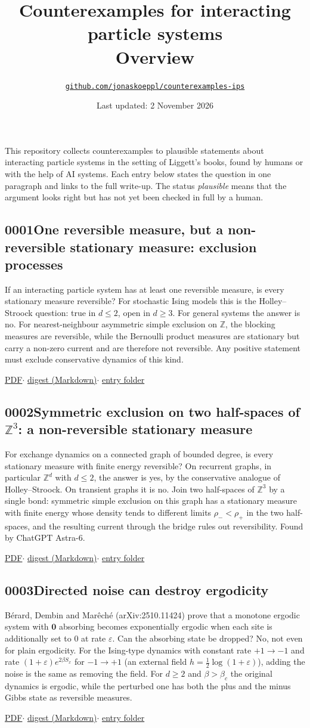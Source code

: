\documentclass[11pt]{article}
\title{Counterexamples for interacting particle systems\\[2pt]\large Overview}
\author{\href{\repo}{\texttt{github.com/jonaskoeppl/counterexamples-ips}}}
\date{Last updated: 2 November 2026\vspace{-1ex}}
\newcommand{\Z}{\mathbb{Z}}
\newcommand{\repo}{https://github.com/jonaskoeppl/counterexamples-ips}
\newcommand{\entrylinks}[1]{\par\smallskip\noindent\small
  \href{\repo/blob/main/pdf/#1.pdf}{PDF}\enspace$\cdot$\enspace
  \href{\repo/blob/main/entries/#1/digest.md}{digest (Markdown)}\enspace$\cdot$\enspace
  \href{\repo/tree/main/entries/#1}{entry folder}\normalsize}
\newcommand{\entry}[3]{\subsection*{#1\quad #2}\noindent{\small Status: \emph{#3}}\par\smallskip\noindent\ignorespaces}
\begin{document}
\maketitle

This repository collects counterexamples to plausible statements about interacting particle systems in the setting of Liggett's books, found by humans or with the help of AI systems. Each entry below states the question in one paragraph and links to the full write-up. The status \emph{plausible} means that the argument looks right but has not yet been checked in full by a human.

\entry{0001}{One reversible measure, but a non-reversible stationary measure: exclusion processes}{plausible}
If an interacting particle system has at least one reversible measure, is every stationary measure reversible? For stochastic Ising models this is the Holley--Stroock question: true in $d\le2$, open in $d\ge3$. For general systems the answer is no. For nearest-neighbour asymmetric simple exclusion on $\Z$, the blocking measures are reversible, while the Bernoulli product measures are stationary but carry a non-zero current and are therefore not reversible. Any positive statement must exclude conservative dynamics of this kind.
\entrylinks{0001-asep-blocking-vs-product-measures}

\entry{0002}{Symmetric exclusion on two half-spaces of $\Z^3$: a non-reversible stationary measure}{plausible}
For exchange dynamics on a connected graph of bounded degree, is every stationary measure with finite energy reversible? On recurrent graphs, in particular $\Z^d$ with $d\le2$, the answer is yes, by the conservative analogue of Holley--Stroock. On transient graphs it is no. Join two half-spaces of $\Z^3$ by a single bond: symmetric simple exclusion on this graph has a stationary measure with finite energy whose density tends to different limits $\rho_-<\rho_+$ in the two half-spaces, and the resulting current through the bridge rules out reversibility. Found by ChatGPT Astra-6.
\entrylinks{0002-sep-two-half-spaces-z3}

\entry{0003}{Directed noise can destroy ergodicity}{plausible}
Bérard, Dembin and Marêché (arXiv:2510.11424) prove that a monotone ergodic system with $\mathbf 0$ absorbing becomes exponentially ergodic when each site is additionally set to $0$ at rate $\varepsilon$. Can the absorbing state be dropped? No, not even for plain ergodicity. For the Ising-type dynamics with constant rate $+1\to-1$ and rate $(1+\varepsilon)e^{2\beta S_x}$ for $-1\to+1$ (an external field $h=\frac12\log(1+\varepsilon)$), adding the noise is the same as removing the field. For $d\ge2$ and $\beta>\beta_c$ the original dynamics is ergodic, while the perturbed one has both the plus and the minus Gibbs state as reversible measures.
\entrylinks{0003-directed-noise-cancels-ising-field}
\end{document}
